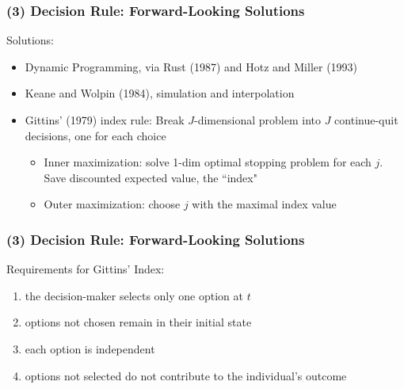 \documentclass[xcolor=pdftex,dvipsnames,table,mathserif,aspectratio=169]{beamer}
\begin{document}
\begin{frame}[label=ALTERNATIVES]

\frametitle{(3) Decision Rule: Forward-Looking Solutions}
\small

Solutions:

\begin{itemize}
\item Dynamic Programming, via Rust (1987) and Hotz and Miller (1993)

\item Keane and Wolpin (1984), simulation and interpolation

\item Gittins' (1979) index rule: Break $J$-dimensional problem into $J$
continue-quit decisions, one for each choice

\begin{itemize}
\item Inner maximization: solve 1-dim optimal stopping problem for each $j$.
Save discounted expected value, the ``index"

\item Outer maximization: choose $j$ with the maximal index value
\end{itemize}
\end{itemize}
\end{frame}

\begin{frame}[label=DYNAM]

\frametitle{(3) Decision Rule: Forward-Looking Solutions}
\small

Requirements for Gittins' Index:

\begin{enumerate}
\item the decision-maker selects only one option at $t$

\item options not chosen remain in their initial state

\item each option is independent

\item options not selected do not contribute to the individual's outcome
\end{enumerate}

\hyperlink{GITTINS}{}
\end{frame}

\end{document}
